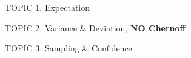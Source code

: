 \documentclass[handout]{mcs}
\begin{document}
\renewcommand{\reading}{
Chapter~\bref{deviation_chap}{Deviation}
}

\begin{staffnotes}
TOPIC 1.  Expectation

TOPIC 2.  Variance \& Deviation, \textbf{NO Chernoff}

TOPIC 3.  Sampling \& Confidence

\end{staffnotes}


\end{document}
